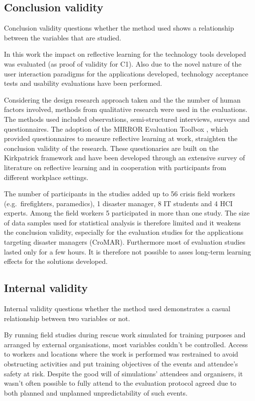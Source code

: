 \subsection{Conclusion validity}\label{conclusion-validity}

Conclusion validity questions whether the method used shows a relationship between the variables that are studied.

In this work the impact on reflective learning for the technology tools developed was evaluated (as proof of validity for C1). Also due to the novel nature of the user interaction paradigms for the applications developed, technology acceptance tests and usability evaluations have been performed.

Considering the design research approach taken and the the number of human factors involved, methods from qualitative research were used in the evaluations. The methods used included observations, semi-structured interviews, surveys and questionnaires. The adoption of the MIRROR Evaluation Toolbox \autocite{Renner:v4nLmwOk}, which provided questionnaires to measure reflective learning at work, straighten the conclusion validity of the research. These questionaries are built on the Kirkpatrick framework \autocite{kirkpatrick2009evaluating} and have been developed through an extensive survey of literature on reflective learning and in cooperation with participants from different workplace settings.

The number of participants in the studies added up to 56 crisis field workers (e.g.~firefighters, paramedics), 1 disaster manager, 8 IT students and 4 HCI experts. Among the field workers 5 participated in more than one study. The size of data samples used for statistical analysis is therefore limited and it weakens the conclusion validity, especially for the evaluation studies for the applications targeting disaster managers (CroMAR). Furthermore most of evaluation studies lasted only for a few hours. It is therefore not possible to asses long-term learning effects for the solutions developed.

\subsection{Internal validity}\label{internal-validity}

Internal validity questions whether the method used demonstrates a casual relationship between two variables or not.

By running field studies during rescue work simulated for training purposes and arranged by external organisations, most variables couldn't be controlled. Access to workers and locations where the work is performed was restrained to avoid obstructing activities and put training objectives of the events and attendee's safety at risk. Despite the good will of simulations' attendees and organisers, it wasn't often possible to fully attend to the evaluation protocol agreed due to both planned and unplanned unpredictability of such events.

